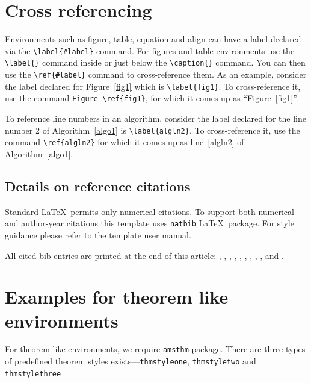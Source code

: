 \documentclass{sn-jnl}
\theoremstyle{thmstyleone}%
\theoremstyle{thmstyletwo}%
\theoremstyle{thmstylethree}%
\begin{document}
\section{Cross referencing}\label{sec8}

Environments such as figure, table, equation and align can have a label
declared via the \verb+\label{#label}+ command. For figures and table
environments use the \verb+\label{}+ command inside or just
below the \verb+\caption{}+ command. You can then use the
\verb+\ref{#label}+ command to cross-reference them. As an example, consider
the label declared for Figure~\ref{fig1} which is
\verb+\label{fig1}+. To cross-reference it, use the command 
\verb+Figure \ref{fig1}+, for which it comes up as
``Figure~\ref{fig1}''. 

To reference line numbers in an algorithm, consider the label declared for the line number 2 of Algorithm~\ref{algo1} is \verb+\label{algln2}+. To cross-reference it, use the command \verb+\ref{algln2}+ for which it comes up as line~\ref{algln2} of Algorithm~\ref{algo1}.

\subsection{Details on reference citations}\label{subsec7}

Standard \LaTeX\ permits only numerical citations. To support both numerical and author-year citations this template uses \verb+natbib+ \LaTeX\ package. For style guidance please refer to the template user manual.


All cited bib entries are printed at the end of this article: \cite{bib3}, \cite{bib4}, \cite{bib5}, \cite{bib6}, \cite{bib7}, \cite{bib8}, \cite{bib9}, \cite{bib10}, \cite{bib11}, \cite{bib12} and \cite{bib13}.


\section{Examples for theorem like environments}\label{sec10}

For theorem like environments, we require \verb+amsthm+ package. There are three types of predefined theorem styles exists---\verb+thmstyleone+, \verb+thmstyletwo+ and \verb+thmstylethree+ 
\end{document}
